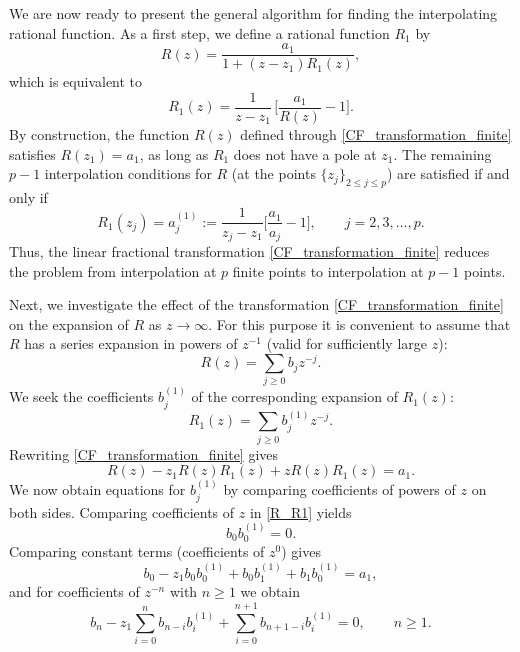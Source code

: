 \documentclass[12pt]{article}
\begin{document}
We are now ready to present the general algorithm for finding the interpolating rational function. As a first step, we define a rational function $R_1$ by 
\begin{equation}\label{CF_transformation_finite}
R(z)=\frac{a_1}{1+(z-z_1) R_1(z)}, 
\end{equation}
which is equivalent to 
\begin{equation*}
R_1(z)=\frac{1}{z-z_1}\,\bigg[ \frac{a_1}{R(z)} -1 \bigg].
\end{equation*}
By construction, the function $R(z)$ defined through \eqref{CF_transformation_finite} satisfies $R(z_1)=a_1$, as long as $R_1$ does not have a pole at $z_1$. The remaining $p-1$ interpolation conditions for $R$ (at the points $\{z_j\}_{2\le j \le p}$) are satisfied if and only if
\begin{equation}\label{R1_conditions_at_zi2}
R_1(z_{j})=a_j^{(1)}:=\frac{1}{z_{j}-z_1} 
\bigg[ \frac{a_1}{a_{j}}-1 \bigg], \qquad j=2,3,\dots,p. 
\end{equation}
Thus, the linear fractional transformation \eqref{CF_transformation_finite} reduces the problem from interpolation at $p$ finite points to interpolation at $p-1$ points. 

Next, we investigate the effect of the transformation
\eqref{CF_transformation_finite} on the expansion of $R$ as $z \to \infty$. For this purpose it is convenient to assume that $R$ has a series expansion in powers of $z^{-1}$ (valid for sufficiently large $z$):  
\begin{equation*}
R(z)=\sum_{j\ge 0} b_j z^{-j}. 
\end{equation*}
We seek the coefficients $b^{(1)}_j$ of the corresponding expansion of $R_1(z)$: 
\begin{equation*}
R_1(z)=\sum_{j\ge 0} b^{(1)}_j z^{-j}.
\end{equation*}
Rewriting \eqref{CF_transformation_finite} gives
\begin{equation}\label{R_R1}
R(z)-z_1  R(z) R_1(z) +z R(z) R_1(z) = a_1.
\end{equation}
We now obtain equations for $b^{(1)}_j$ by comparing coefficients of powers of $z$ on both sides.  
Comparing coefficients of $z$ in \eqref{R_R1} yields
\begin{equation}\label{eqn_b_b1_1}
b_0 b^{(1)}_0=0.
\end{equation} 
Comparing constant terms (coefficients of $z^{0}$) gives
\begin{equation}\label{eqn_b_b1_0}
b_0- z_1 b_0 b_0^{(1)}+b_0 b_1^{(1)}+b_1 b_0^{(1)}=a_1,
\end{equation}
and for coefficients of $z^{-n}$ with $n\ge 1$ we obtain
\begin{equation}\label{eqn_b_b1_n}
b_n - z_1 \sum_{i=0}^n b_{n-i} b_{i}^{(1)}+ 
\sum_{i=0}^{n+1} b_{n+1-i} b_{i}^{(1)}=0, \qquad n\ge 1. 
\end{equation}
\end{document}
